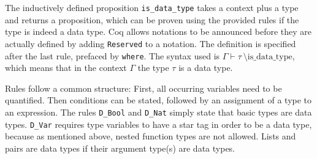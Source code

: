 \documentclass[fleqn]{scrreprt}
\newcommand{\coqinline}[1]{\texttt{#1}}
\begin{document}
The inductively defined proposition \coqinline{is_data_type} takes a context plus a type and returns a proposition, which can be proven using the provided rules if the type is indeed a data type. Coq allows notations to be announced before they are actually defined by adding \coqinline{Reserved} to a notation. The definition is specified after the last rule, prefaced by \coqinline{where}. The syntax used is $\Gamma \vdash \tau \: \text{\textbackslash is\_data\_type}$, which means that in the context $\Gamma$ the type $\tau$ is a data type.
\par
Rules follow a common structure: First, all occurring variables need to be quantified. Then conditions can be stated, followed by an assignment of a type to an expression.
The rules \coqinline{D_Bool} and \coqinline{D_Nat} simply state that basic types are data types. \coqinline{D_Var} requires type variables to have a star tag in order to be a data type, because as mentioned above, nested function types are not allowed. Lists and pairs are data types if their argument type(s) are data types. 
\par
\end{document}
